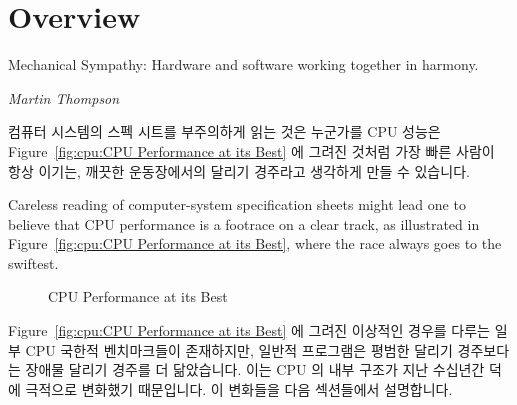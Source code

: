 
\section{Overview}
\label{sec:cpu:Overview}
%
\epigraph{Mechanical Sympathy: Hardware and software working together in
	  harmony.}{\emph{Martin Thompson}}

컴퓨터 시스템의 스펙 시트를 부주의하게 읽는 것은 누군가를 CPU 성능은
Figure~\ref{fig:cpu:CPU Performance at its Best} 에 그려진 것처럼 가장 빠른
사람이 항상 이기는, 깨끗한 운동장에서의 달리기 경주라고 생각하게 만들 수
있습니다.

Careless reading of computer-system specification sheets might lead one
to believe that CPU performance is a footrace on a clear track, as
illustrated in Figure~\ref{fig:cpu:CPU Performance at its Best},
where the race always goes to the swiftest.

\begin{figure}[htb]
\centering
{}
\caption{CPU Performance at its Best}
\end{figure}

Figure~\ref{fig:cpu:CPU Performance at its Best} 에 그려진 이상적인 경우를
다루는 일부 CPU 국한적 벤치마크들이 존재하지만, 일반적 프로그램은 평범한 달리기
경주보다는 장애물 달리기 경주를 더 닮았습니다.
이는 CPU 의 내부 구조가 지난 수십년간  덕에 극적으로 변화했기
때문입니다.
이 변화들을 다음 섹션들에서 설명합니다.

